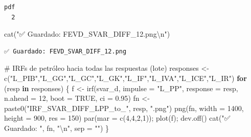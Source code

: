 \documentclass[
  spanish,
  letterpaper,
  DIV=11,
  numbers=noendperiod]{scrartcl}
\newenvironment{Shaded}{\begin{snugshade}}{\end{snugshade}}
\newcommand{\AttributeTok}[1]{\textcolor[rgb]{0.40,0.45,0.13}{#1}}
\newcommand{\CommentTok}[1]{\textcolor[rgb]{0.37,0.37,0.37}{#1}}
\newcommand{\ConstantTok}[1]{\textcolor[rgb]{0.56,0.35,0.01}{#1}}
\newcommand{\ControlFlowTok}[1]{\textcolor[rgb]{0.00,0.23,0.31}{\textbf{#1}}}
\newcommand{\DecValTok}[1]{\textcolor[rgb]{0.68,0.00,0.00}{#1}}
\newcommand{\FloatTok}[1]{\textcolor[rgb]{0.68,0.00,0.00}{#1}}
\newcommand{\FunctionTok}[1]{\textcolor[rgb]{0.28,0.35,0.67}{#1}}
\newcommand{\NormalTok}[1]{\textcolor[rgb]{0.00,0.23,0.31}{#1}}
\newcommand{\OtherTok}[1]{\textcolor[rgb]{0.00,0.23,0.31}{#1}}
\newcommand{\SpecialCharTok}[1]{\textcolor[rgb]{0.37,0.37,0.37}{#1}}
\newcommand{\StringTok}[1]{\textcolor[rgb]{0.13,0.47,0.30}{#1}}
\begin{document}
\begin{verbatim}
pdf 
  2 
\end{verbatim}

\begin{Shaded}
\begin{Highlighting}[]
\FunctionTok{cat}\NormalTok{(}\StringTok{"✅ Guardado: FEVD\_SVAR\_DIFF\_12.png}\SpecialCharTok{\textbackslash{}n}\StringTok{"}\NormalTok{)}
\end{Highlighting}
\end{Shaded}

\begin{verbatim}
✅ Guardado: FEVD_SVAR_DIFF_12.png
\end{verbatim}

\begin{Shaded}
\begin{Highlighting}[]
\CommentTok{\# IRFs de petróleo hacia todas las respuestas (lote)}
\NormalTok{responses }\OtherTok{\textless{}{-}} \FunctionTok{c}\NormalTok{(}\StringTok{"L\_PIB"}\NormalTok{,}\StringTok{"L\_GG"}\NormalTok{,}\StringTok{"L\_GC"}\NormalTok{,}\StringTok{"L\_GK"}\NormalTok{,}\StringTok{"L\_IF"}\NormalTok{,}\StringTok{"L\_IVA"}\NormalTok{,}\StringTok{"L\_ICE"}\NormalTok{,}\StringTok{"L\_IR"}\NormalTok{)}
\ControlFlowTok{for}\NormalTok{ (resp }\ControlFlowTok{in}\NormalTok{ responses) \{}
\NormalTok{  f }\OtherTok{\textless{}{-}} \FunctionTok{irf}\NormalTok{(svar\_d, }\AttributeTok{impulse =} \StringTok{"L\_PP"}\NormalTok{, }\AttributeTok{response =}\NormalTok{ resp, }\AttributeTok{n.ahead =} \DecValTok{12}\NormalTok{, }\AttributeTok{boot =} \ConstantTok{TRUE}\NormalTok{, }\AttributeTok{ci =} \FloatTok{0.95}\NormalTok{)}
\NormalTok{  fn }\OtherTok{\textless{}{-}} \FunctionTok{paste0}\NormalTok{(}\StringTok{"IRF\_SVAR\_DIFF\_LPP\_to\_"}\NormalTok{, resp, }\StringTok{".png"}\NormalTok{)}
  \FunctionTok{png}\NormalTok{(fn, }\AttributeTok{width =} \DecValTok{1400}\NormalTok{, }\AttributeTok{height =} \DecValTok{900}\NormalTok{, }\AttributeTok{res =} \DecValTok{150}\NormalTok{)}
  \FunctionTok{par}\NormalTok{(}\AttributeTok{mar =} \FunctionTok{c}\NormalTok{(}\DecValTok{4}\NormalTok{,}\DecValTok{4}\NormalTok{,}\DecValTok{2}\NormalTok{,}\DecValTok{1}\NormalTok{)); }\FunctionTok{plot}\NormalTok{(f); }\FunctionTok{dev.off}\NormalTok{()}
  \FunctionTok{cat}\NormalTok{(}\StringTok{"✅ Guardado: "}\NormalTok{, fn, }\StringTok{"}\SpecialCharTok{\textbackslash{}n}\StringTok{"}\NormalTok{, }\AttributeTok{sep =} \StringTok{""}\NormalTok{)}
\NormalTok{\}}
\end{Highlighting}
\end{Shaded}
\end{document}
